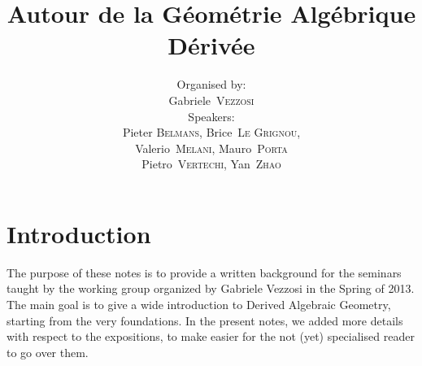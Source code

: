 \documentclass[a4paper]{memoir}
\title{Autour de la G\'eom\'etrie Alg\'ebrique D\'eriv\'ee}
\author{
Organised by: \\[.2em] \hspace*{.5cm} Gabriele~\textsc{Vezzosi} \\[.4em] Speakers: \\[.2em] \hspace*{.5cm} Pieter \textsc{Belmans}, Brice~\textsc{Le Grignou}, \\\hspace*{.5cm} Valerio~\textsc{Melani}, Mauro~\textsc{Porta} \\\hspace*{.5cm} Pietro~\textsc{Vertechi}, Yan~\textsc{Zhao}
}
\theoremstyle{plain}
\theoremstyle{definition}
\theoremstyle{remark}
\begin{document}

\makeatletter
\renewcommand{\cfttocbeforelisthook}{\pagestyle{simple}\let\ps@plain\ps@empty}
\renewcommand{\cfttocafterlisthook}{\cleardoublepage\pagestyle{headings}}
\makeatother

\frontmatter

\tableofcontents*

\pagestyle{headings}

\chapter*{Introduction}

The purpose of these notes is to provide a written background for the seminars taught by the working group organized by Gabriele Vezzosi in the Spring of 2013. The main goal is to give a wide introduction to Derived Algebraic Geometry, starting from the very foundations. In the present notes, we added more details with respect to the expositions, to make easier for the not (yet) specialised reader to go over them.
\end{document}
